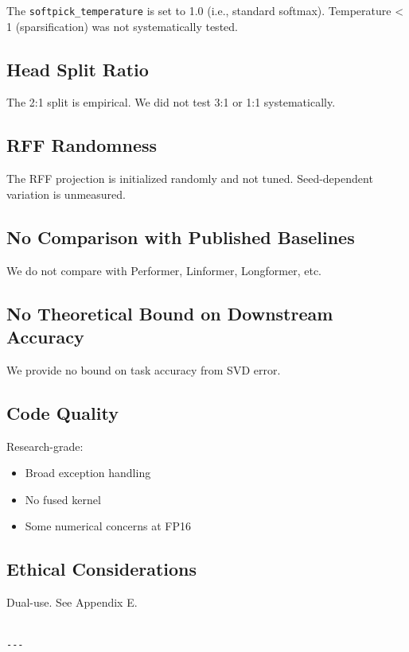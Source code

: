 The \texttt{softpick\_temperature} is set to 1.0 (i.e., standard softmax). 
Temperature \textless{} 1 (sparsification) was not systematically tested.

\subsection{Head Split Ratio}

The 2:1 split is empirical. We did not test 3:1 or 1:1 systematically.

\subsection{RFF Randomness}

The RFF projection is initialized randomly and not tuned. Seed-dependent 
variation is unmeasured.

\subsection{No Comparison with Published Baselines}

We do not compare with Performer, Linformer, Longformer, etc.

\subsection{No Theoretical Bound on Downstream Accuracy}

We provide no bound on task accuracy from SVD error.

\subsection{Code Quality}

Research-grade:
\begin{itemize}
\item Broad exception handling
\item No fused kernel
\item Some numerical concerns at FP16

\end{itemize}
\subsection{Ethical Considerations}

Dual-use. See Appendix E.
\begin{lstlisting}

---
\end{lstlisting}

